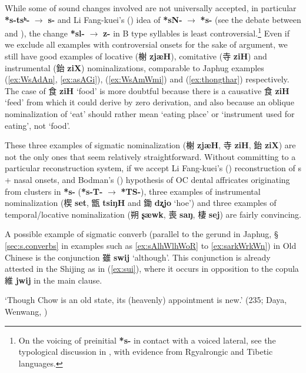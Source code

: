 \documentclass[oneside,a4paper,11pt]{article}
\newcommand{\ipa}[1]{\textbf{{\phon\mbox{#1}}}} %
\newcommand{\zh}[1]{{\cn #1}}
\newcommand{\zhc}[2]{\zh{#1} \ipa{#2}}
\begin{document}
  
While some of sound changes involved are not universally accepted, in particular \ipa{*s-tsʰ-} $\rightarrow$ \ipa{s-} and Li Fang-kuei's (\citealt{lifk71shanggu}) idea of \ipa{*sN-} $\rightarrow$ \ipa{*s-} (see the debate between  \citealt{mei12caus} and \citealt{sagart12sprefix}), the change \ipa{*sl-} $\rightarrow$ \ipa{z-} in B type syllables is least controversial.\footnote{On the voicing of preinitial \ipa{*s-} in contact with a voiced lateral, see the typological discussion in \citet{gong16ld}, with evidence from Rgyalrongic and Tibetic languages.} Even if we exclude all examples with controversial onsets for the sake of argument, we still have good examples of locative (\zhc{榭}{zjæH}), comitative (\zhc{寺}{ziH}) and instrumental (\zhc{鈶}{ziX}) nominalizations, comparable to Japhug examples (\ref{ex:WsAdAn}, \ref{ex:asAGi}), (\ref{ex:WsAmWmi}) and (\ref{ex:thongthar}) respectively. The case of \zhc{食}{ziH} `food' is more doubtful because there is a causative \zhc{食}{ziH} `feed' from which it could derive by zero derivation, and also because an oblique nominalization of `eat' should rather mean `eating place' or `instrument used for eating', not `food'.

These three examples of sigmatic nominalization  (\zhc{榭}{zjæH}, \zhc{寺}{ziH},  \zhc{鈶}{ziX}) are not the only ones that seem relatively straightforward. Without committing to a particular reconstruction system, if we accept Li Fang-kuei's (\citealt{lifk71shanggu}) reconstruction of s + nasal onsets, and Bodman's (\citeyear{bodman69sdud}) hypothesis of OC dental affricates originating from clusters in \ipa{*s-} (\ipa{*s-T-} $\rightarrow$ \ipa{*TS-}), three examples of instrumental nominalization (\zhc{楔}{set},   \zhc{甑}{tsiŋH} and \zhc{鋤}{dʐjo} ‘hoe’) and three examples of temporal/locative nominalization (\zhc{朔}{ʂæwk}, \zhc{喪}{saŋ}, \zhc{棲}{sej}) are fairly convincing.

 A possible example of sigmatic converb (parallel to the gerund in Japhug, § \ref{sec:s.converbs} in examples such as \ref{ex:sAlhWlhWoR} to \ref{ex:sarkWrkWn}) in Old Chinese is the conjunction \zhc{雖}{swij} `although'. This conjunction is already attested in the Shijing as in (\ref{ex:sui}),  where it occurs in opposition to the copula \zhc{維}{jwij}  in the main clause.
 
 \begin{exe}
\ex \label{ex:sui}
 \glt \zh{周雖舊邦，其命維新} 
 \glt `Though Chow is an old state, its (heavenly) appointment is new.' (235; Daya, Wenwang, \citealt[185]{karlgren74odes})
\end{exe}
\end{document}
